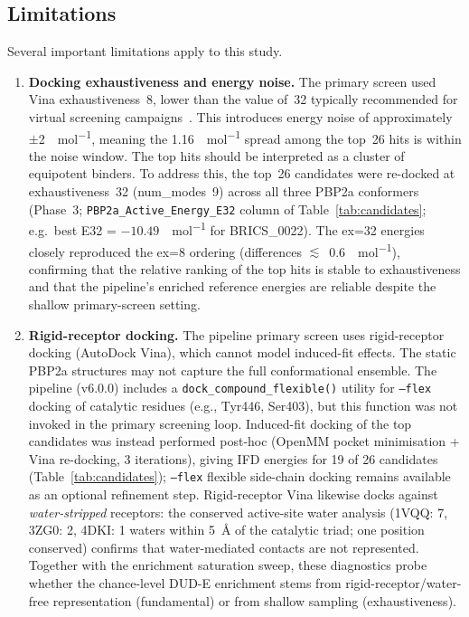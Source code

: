 \documentclass[12pt]{article}
\begin{document}
\subsection{Limitations}
Several important limitations apply to this study.

\begin{enumerate}
    \item \textbf{Docking exhaustiveness and energy noise.} The primary screen used Vina exhaustiveness~8, lower than the value of~32 typically recommended for virtual screening campaigns~\cite{trott2010}. This introduces energy noise of approximately $\pm$\SI{2}{\kcal\per\mol}, meaning the 1.16~\si{\kcal\per\mol} spread among the top~26 hits is within the noise window. The top hits should be interpreted as a cluster of equipotent binders. To address this, the top~26 candidates were re-docked at exhaustiveness~32 (num\_modes~9) across all three PBP2a conformers (Phase~3; \texttt{PBP2a\_Active\_Energy\_E32} column of Table~\ref{tab:candidates}; e.g.\ best E32 = $-10.49$~\si{\kcal\per\mol} for BRICS\_0022). The ex=32 energies closely reproduced the ex=8 ordering (differences $\lesssim$~0.6~\si{\kcal\per\mol}), confirming that the relative ranking of the top hits is stable to exhaustiveness and that the pipeline's enriched reference energies are reliable despite the shallow primary-screen setting.

    \item \textbf{Rigid-receptor docking.} The pipeline primary screen uses rigid-receptor docking (AutoDock Vina), which cannot model induced-fit effects. The static PBP2a structures may not capture the full conformational ensemble. The pipeline (v6.0.0) includes a \texttt{dock\_compound\_flexible()} utility for \texttt{--flex} docking of catalytic residues (e.g., Tyr446, Ser403), but this function was not invoked in the primary screening loop. Induced-fit docking of the top candidates was instead performed post-hoc (OpenMM pocket minimisation + Vina re-docking, 3 iterations), giving IFD energies for 19 of 26 candidates (Table~\ref{tab:candidates}); \texttt{--flex} flexible side-chain docking remains available as an optional refinement step. Rigid-receptor Vina likewise docks against \emph{water-stripped} receptors: the conserved active-site water analysis (1VQQ: 7, 3ZG0: 2, 4DKI: 1 waters within 5~\si{\angstrom} of the catalytic triad; one position conserved) confirms that water-mediated contacts are not represented. Together with the enrichment saturation sweep, these diagnostics probe whether the chance-level DUD-E enrichment stems from rigid-receptor/water-free representation (fundamental) or from shallow sampling (exhaustiveness).


\end{enumerate}
\end{document}
